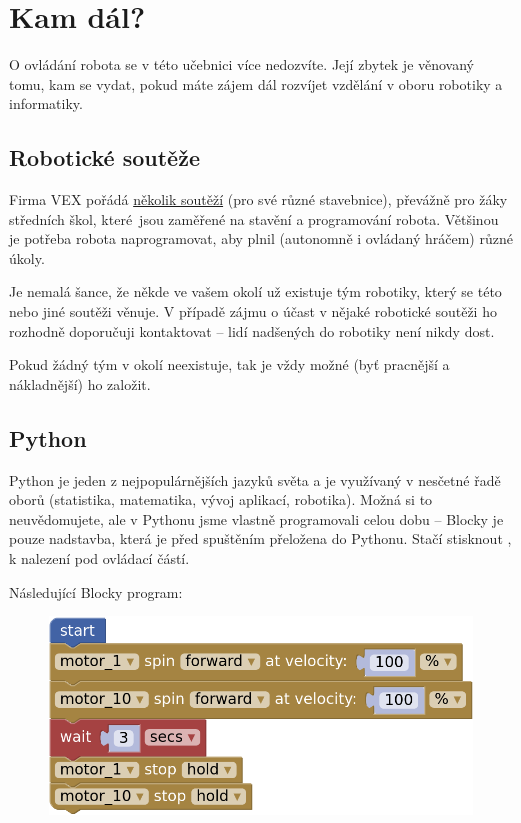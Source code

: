 \documentclass[../main.tex]{subfiles}
\begin{document}
	\section{Kam dál?}
	O ovládání robota se v této učebnici více nedozvíte. Její zbytek je věnovaný tomu, kam se vydat, pokud máte zájem dál rozvíjet vzdělání v oboru robotiky a informatiky.

	\subsection{Robotické soutěže}
	Firma VEX pořádá \href{https://www.vexrobotics.com/competition?___store=vexroboticseu&___from_store=vexrobotics}{několik soutěží} (pro své různé stavebnice), převážně pro žáky středních škol, které~jsou zaměřené na stavění a programování robota. Většinou je potřeba robota naprogramovat, aby plnil (autonomně i ovládaný hráčem) různé úkoly.

	Je nemalá šance, že někde ve vašem okolí už existuje tým robotiky, který se této nebo jiné soutěži věnuje. V případě zájmu o účast v nějaké robotické soutěži ho rozhodně doporučuji kontaktovat -- lidí nadšených do robotiky není nikdy dost.

	Pokud žádný tým v okolí neexistuje, tak je vždy možné (byť pracnější a nákladnější) ho založit. 

	\subsection{Python}
	Python je jeden z nejpopulárnějších jazyků světa a je využívaný v nesčetné řadě oborů (statistika, matematika, vývoj aplikací, robotika). Možná si to neuvědomujete, ale v Pythonu jsme vlastně \mbox{programovali} celou dobu -- Blocky je pouze nadstavba, která je před spuštěním přeložena do Pythonu. Stačí stisknout , k nalezení pod ovládací částí.

	Následující Blocky program:

	\begin{figure}[h!]
		\centering
		\begin{minipage}{0.50\textwidth}
			\includegraphics[width=\linewidth]{Images/06/program.png}
		\end{minipage}
	\end{figure}
\end{document}
